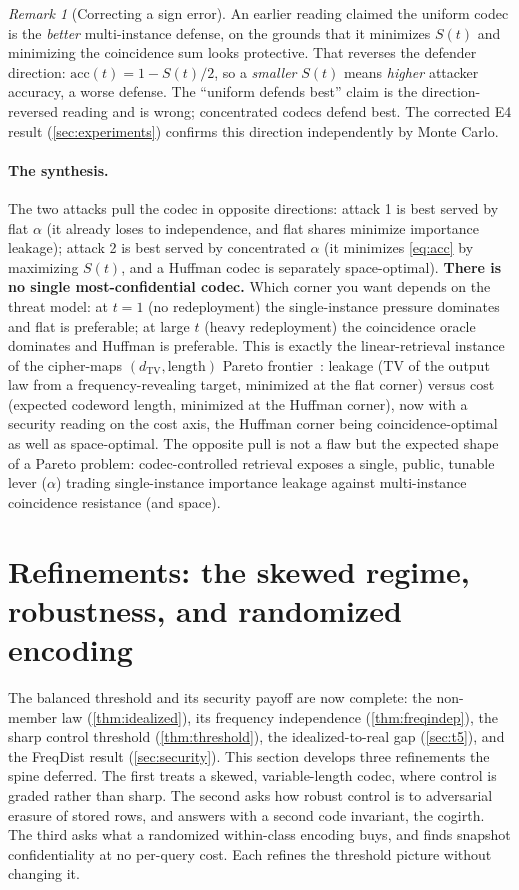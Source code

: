 \documentclass[11pt]{article}
\theoremstyle{definition}
\theoremstyle{plain}
\theoremstyle{remark}
\newtheorem{remark}{Remark}[section]
\newcommand{\TV}{d_{\mathrm{TV}}}
\newcommand{\al}{\alpha}                    %
\begin{document}
\begin{remark}[Correcting a sign error]
\label{rem:sign}
An earlier reading claimed the uniform codec is the \emph{better} multi-instance defense,
on the grounds that it minimizes $S(t)$ and minimizing the coincidence sum looks
protective. That reverses the defender direction: $\mathrm{acc}(t) = 1 - S(t)/2$, so a
\emph{smaller} $S(t)$ means \emph{higher} attacker accuracy, a worse defense. The ``uniform
defends best'' claim is the direction-reversed reading and is wrong; concentrated codecs
defend best. The corrected E4 result (\cref{sec:experiments}) confirms this direction
independently by Monte Carlo.
\end{remark}

\paragraph{The synthesis.}
The two attacks pull the codec in opposite directions: attack 1 is best served by flat
$\al$ (it already loses to independence, and flat shares minimize importance leakage);
attack 2 is best served by concentrated $\al$ (it minimizes \eqref{eq:acc} by maximizing
$S(t)$, and a Huffman codec is separately space-optimal). \textbf{There is no single
most-confidential codec.} Which corner you want depends on the threat model: at $t = 1$
(no redeployment) the single-instance pressure dominates and flat is preferable; at large
$t$ (heavy redeployment) the coincidence oracle dominates and Huffman is preferable. This
is exactly the linear-retrieval instance of the cipher-maps $(\TV, \text{length})$ Pareto
frontier~\cite{towell2026ciphermaps}: leakage (TV of the output law from a
frequency-revealing target, minimized at the flat corner) versus cost (expected codeword
length, minimized at the Huffman corner), now with a security reading on the cost axis,
the Huffman corner being coincidence-optimal as well as space-optimal. The opposite pull is
not a flaw but the expected shape of a Pareto problem: codec-controlled retrieval exposes a
single, public, tunable lever ($\al$) trading single-instance importance leakage against
multi-instance coincidence resistance (and space).

\section{Refinements: the skewed regime, robustness, and randomized encoding}
\label{sec:refinements}

The balanced threshold and its security payoff are now complete: the non-member law
(\cref{thm:idealized}), its frequency independence (\cref{thm:freqindep}), the sharp
control threshold (\cref{thm:threshold}), the idealized-to-real gap (\cref{sec:t5}),
and the FreqDist result (\cref{sec:security}). This section develops three refinements
the spine deferred. The first treats a skewed, variable-length codec, where control is
graded rather than sharp. The second asks how robust control is to adversarial erasure
of stored rows, and answers with a second code invariant, the cogirth. The third asks
what a randomized within-class encoding buys, and finds snapshot confidentiality at no
per-query cost. Each refines the threshold picture without changing it.
\end{document}
